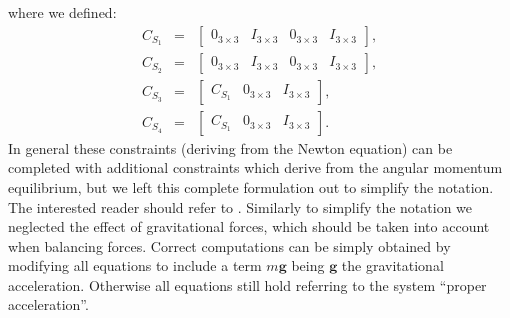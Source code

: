 \documentclass[12pt,a4paper,twoside]{article}
\begin{document}
where we defined:
\begin{eqnarray*}
C_{S_1} & = & \begin{bmatrix} 0_{3\times3} & I_{3\times3} & 0_{3\times3} & I_{3\times3} \end{bmatrix}, \\
C_{S_2} & = & \begin{bmatrix} 0_{3\times3} & I_{3\times3} & 0_{3\times3} & I_{3\times3} \end{bmatrix}, \\
C_{S_3} & = & \begin{bmatrix}  C_{S_1} & 0_{3\times3} & I_{3\times3}\end{bmatrix}, \\
C_{S_4} & = & \begin{bmatrix}  C_{S_1} & 0_{3\times3} & I_{3\times3}\end{bmatrix}.
\end{eqnarray*}
In general these constraints (deriving from the Newton equation) can be completed with additional constraints which derive from the angular momentum equilibrium, but we left this complete formulation out to simplify the notation. The interested reader should refer to \cite{orin2013}. Similarly to simplify the notation we neglected the effect of gravitational forces, which should be taken into account when balancing forces. Correct computations can be simply obtained by modifying all equations to include a term $m \bm g$ being $\bm g$ the gravitational acceleration. Otherwise all equations still hold referring to the system ``proper acceleration''. 
\end{document}
